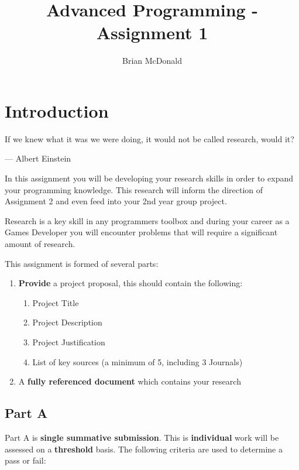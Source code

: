\documentclass{../../fal_assignment}
\title{Advanced Programming - Assignment 1}
\author{Brian McDonald}
\begin{document}
\maketitle

\section*{Introduction}

\begin{marginquote}
If we knew what it was we were doing, it would not be called research, would it?

--- Albert Einstein

\end{marginquote}

In this assignment you will be developing your research skills in order to expand your programming knowledge. This research will inform the direction of Assignment 2 and even feed into your 2nd year group project.

Research is a key skill in any programmers toolbox and during your career as a Games Developer you will encounter problems that will require a significant amount of research.

This assignment is formed of several parts:

\begin{enumerate}[label=(\Alph*)]
	\item \textbf{Provide} a project proposal, this should contain the following:
	\begin{enumerate}
		\item Project Title
		\item Project Description
		\item Project Justification
		\item List of key sources  (a minimum of 5, including 3 Journals) 
	\end{enumerate}
    \item A \textbf{fully referenced document} which contains your research
\end{enumerate}

\subsection*{Part A}

Part A is \textbf{single summative submission}. This is \textbf{individual} work will be assessed on a \textbf{threshold} basis. The following criteria are used to determine a pass or fail: 
\end{document}
